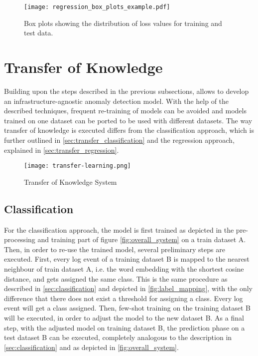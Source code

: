 \begin{figure}[h]
  \centering
  \texttt{[image: regression\_box\_plots\_example.pdf]} \\
  \caption{Box plots showing the distribution of loss values for training and test data.}
  \label{fig:regression_with_threshold}
\end{figure}

\newpage
\section{Transfer of Knowledge \label{sec:transferlearning}}
Building upon the steps described in the previous subsections, allows to develop an infrastructure-agnostic anomaly detection model. With the help of the described techniques, frequent re-training of models can be avoided and models trained on one dataset can be ported to be used with different datasets. The way transfer of knowledge is executed differs from the classification approach, which is further outlined in \ref{sec:transfer_classification} and the regression approach, explained in \ref{sec:transfer_regression}. 

\begin{figure}[H]
	\centering
	\texttt{[image: transfer-learning.png]}
	\caption{Transfer of Knowledge System}
	\label{fig:transfer_learning_system}
\end{figure}

\subsection{Classification \label{sec:transfer_classification}}
For the classification approach, the model is first trained as depicted in the pre-processing and training part of figure \ref{fig:overall_system} on a train dataset A. Then, in order to re-use the trained model, several preliminary steps are executed. First, every log event of a training dataset B is mapped to the nearest neighbour of train dataset A, i.e. the word embedding with the shortest cosine distance, and gets assigned the same class. This is the same procedure as described in \ref{sec:classification} and depicted in \ref{fig:label_mapping}, with the only difference that there does not exist a threshold for assigning a class. Every log event will get a class assigned. Then, few-shot training on the training dataset B will be executed, in order to adjust the model to the new dataset B. As a final step, with the adjusted model on training dataset B, the prediction phase on a test dataset B can be executed, completely analogous to the description in \ref{sec:classification} and as depicted in \ref{fig:overall_system}.

